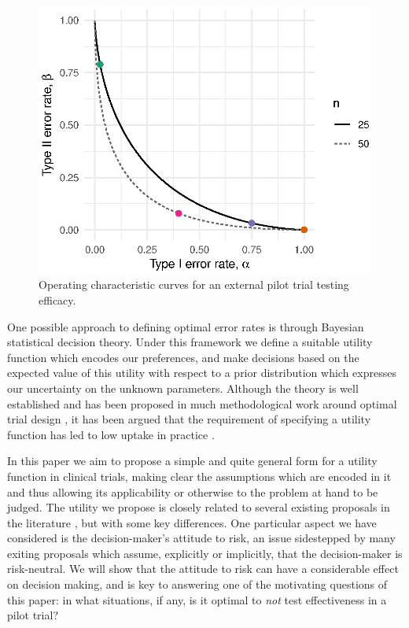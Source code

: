\documentclass[sagev, Crown]{sagej} %
\begin{document}
\begin{figure}
\centering
\includegraphics[scale=0.8]{./figures/ocs.eps}
\caption{Operating characteristic curves for an external pilot trial testing efficacy.}
\label{fig:ocs}
\end{figure} 

One possible approach to defining optimal error rates is through Bayesian statistical decision theory. Under this framework we define a suitable utility function which encodes our preferences, and make decisions based on the expected value of this utility with respect to a prior distribution which expresses our uncertainty on the unknown parameters. Although the theory is well established \cite{Raiffa1961, Keeney1976, Lindley1997} and has been proposed in much methodological work around optimal trial design \cite{Hee2016}, it has been argued that the requirement of specifying a utility function has led to low uptake in practice \cite{Joseph1997a}. 

In this paper we aim to propose a simple and quite general form for a utility function in clinical trials, making clear the assumptions which are encoded in it and thus allowing its applicability or otherwise to the problem at hand to be judged. The utility we propose is closely related to several existing proposals in the literature \cite{Pearce2018}, but with some key differences. One particular aspect we have considered is the decision-maker's attitude to risk, an issue sidestepped by many exiting proposals which assume, explicitly or implicitly, that the decision-maker is risk-neutral. We will show that the attitude to risk can have a considerable effect on decision making, and is key to answering one of the motivating questions of this paper: in what situations, if any, is it optimal to \emph{not} test effectiveness in a pilot trial?
\end{document}
